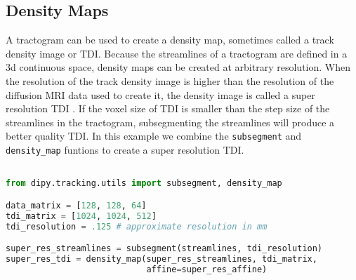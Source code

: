 \subsection{Density Maps}

A tractogram can be used to create a density map, sometimes called a track density image or TDI\cite{Calamante_2010, Calamante_2016}. Because the streamlines of a tractogram are defined in a 3d continuous space, density maps can be created at arbitrary resolution. When the resolution of the track density image is higher than the resolution of the diffusion MRI data used to create it, the density image is called a super resolution TDI \cite{Calamante_2016}. If the voxel size of TDI is smaller than the step size of the streamlines in the tractogram, subsegmenting the streamlines will produce a better quality TDI. In this example we combine the \verb|subsegment| and \verb|density_map| funtions to create a super resolution TDI.

\begin{lstlisting}[language=python]

from dipy.tracking.utils import subsegment, density_map

data_matrix = [128, 128, 64]
tdi_matrix = [1024, 1024, 512]
tdi_resolution = .125 # approximate resolution in mm

super_res_streamlines = subsegment(streamlines, tdi_resolution)
super_res_tdi = density_map(super_res_streamlines, tdi_matrix,
                            affine=super_res_affine)

\end{lstlisting}
